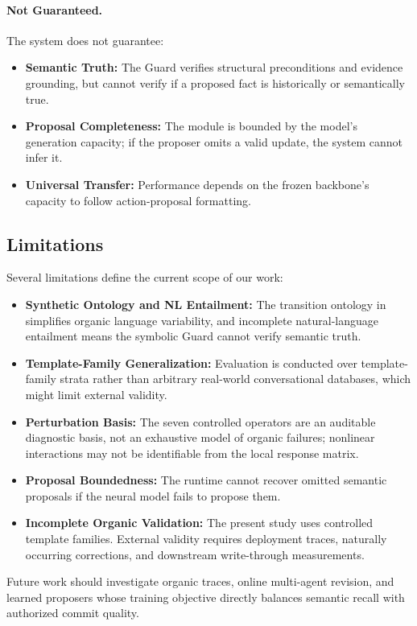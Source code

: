 \paragraph{Not Guaranteed.}
The system does not guarantee:
\begin{itemize}[leftmargin=*]
\item \textbf{Semantic Truth:} The Guard verifies structural preconditions and evidence grounding, but cannot verify if a proposed fact is historically or semantically true.
\item \textbf{Proposal Completeness:} The module is bounded by the model's generation capacity; if the proposer omits a valid update, the system cannot infer it.
\item \textbf{Universal Transfer:} Performance depends on the frozen backbone's capacity to follow action-proposal formatting.
\end{itemize}

\subsection{Limitations}

Several limitations define the current scope of our work:
\begin{itemize}[leftmargin=*]
\item \textbf{Synthetic Ontology and NL Entailment:} The transition ontology in \bench{} simplifies organic language variability, and incomplete natural-language entailment means the symbolic Guard cannot verify semantic truth.
\item \textbf{Template-Family Generalization:} Evaluation is conducted over template-family strata rather than arbitrary real-world conversational databases, which might limit external validity.
\item \textbf{Perturbation Basis:} The seven controlled operators are an auditable diagnostic basis, not an exhaustive model of organic failures; nonlinear interactions may not be identifiable from the local response matrix.
\item \textbf{Proposal Boundedness:} The runtime cannot recover omitted semantic proposals if the neural model fails to propose them.
\item \textbf{Incomplete Organic Validation:} The present study uses controlled template families. External validity requires deployment traces, naturally occurring corrections, and downstream write-through measurements.
\end{itemize}
Future work should investigate organic traces, online multi-agent revision, and learned proposers whose training objective directly balances semantic recall with authorized commit quality.
